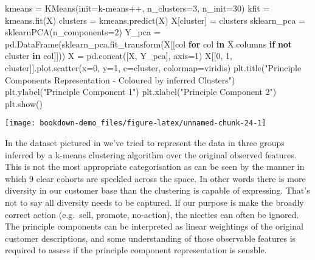 \documentclass[]{tufte-book}
\newenvironment{Shaded}{}{}
\newcommand{\ControlFlowTok}[1]{\textcolor[rgb]{0.00,0.44,0.13}{\textbf{#1}}}
\newcommand{\DecValTok}[1]{\textcolor[rgb]{0.25,0.63,0.44}{#1}}
\newcommand{\KeywordTok}[1]{\textcolor[rgb]{0.00,0.44,0.13}{\textbf{#1}}}
\newcommand{\NormalTok}[1]{#1}
\newcommand{\OperatorTok}[1]{\textcolor[rgb]{0.40,0.40,0.40}{#1}}
\newcommand{\StringTok}[1]{\textcolor[rgb]{0.25,0.44,0.63}{#1}}
\theoremstyle{definition}
\theoremstyle{definition}
\theoremstyle{definition}
\theoremstyle{remark}
\begin{document}
\begin{Shaded}
\begin{Highlighting}[]
\NormalTok{kmeans }\OperatorTok{=}\NormalTok{ KMeans(init}\OperatorTok{=}\StringTok{\textquotesingle{}k{-}means++\textquotesingle{}}\NormalTok{, n\_clusters}\OperatorTok{=}\DecValTok{3}\NormalTok{, n\_init}\OperatorTok{=}\DecValTok{30}\NormalTok{)}
\NormalTok{kfit }\OperatorTok{=}\NormalTok{ kmeans.fit(X)}
\NormalTok{clusters }\OperatorTok{=}\NormalTok{ kmeans.predict(X)}
\NormalTok{X[}\StringTok{\textquotesingle{}cluster\textquotesingle{}}\NormalTok{] }\OperatorTok{=}\NormalTok{ clusters}
\NormalTok{sklearn\_pca }\OperatorTok{=}\NormalTok{ sklearnPCA(n\_components}\OperatorTok{=}\DecValTok{2}\NormalTok{)}
\NormalTok{Y\_pca }\OperatorTok{=}\NormalTok{ pd.DataFrame(sklearn\_pca.fit\_transform(X[[col }\ControlFlowTok{for}\NormalTok{ col }\KeywordTok{in}\NormalTok{ X.columns }\ControlFlowTok{if}
                                         \KeywordTok{not} \StringTok{\textquotesingle{}cluster\textquotesingle{}} \KeywordTok{in}\NormalTok{ col]]))}
\NormalTok{X }\OperatorTok{=}\NormalTok{ pd.concat([X, Y\_pca], axis}\OperatorTok{=}\DecValTok{1}\NormalTok{)}
\NormalTok{X[[}\DecValTok{0}\NormalTok{, }\DecValTok{1}\NormalTok{, }\StringTok{\textquotesingle{}cluster\textquotesingle{}}\NormalTok{]].plot.scatter(x}\OperatorTok{=}\DecValTok{0}\NormalTok{,}
\NormalTok{                      y}\OperatorTok{=}\DecValTok{1}\NormalTok{,}
\NormalTok{                      c}\OperatorTok{=}\StringTok{\textquotesingle{}cluster\textquotesingle{}}\NormalTok{,}
\NormalTok{                      colormap}\OperatorTok{=}\StringTok{\textquotesingle{}viridis\textquotesingle{}}\NormalTok{)}
\NormalTok{plt.title(}\StringTok{"Principle Components Representation {-} Coloured by inferred Clusters"}\NormalTok{)}
\NormalTok{plt.ylabel(}\StringTok{"Principle Component 1"}\NormalTok{)}
\NormalTok{plt.xlabel(}\StringTok{"Principle Component 2"}\NormalTok{)}
\NormalTok{plt.show()}
\end{Highlighting}
\end{Shaded}

\texttt{[image: bookdown-demo\_files/figure-latex/unnamed-chunk-24-1]}

In the dataset pictured in we've tried to represent the data in three groups inferred by a k-means clustering algorithm over the original observed features. This is not the most appropriate categorisation as can be seen by the manner in which 9 clear cohorts are speckled across the space. In other words there is more diversity in our customer base than the clustering is capable of expressing. That's not to say all diversity needs to be captured. If our purpose is make the broadly correct action (e.g.~sell, promote, no-action), the niceties can often be ignored. The principle components can be interpreted as linear weightings of the original customer descriptions, and some understanding of those observable features is required to assess if the principle component representation is sensble.
\end{document}
